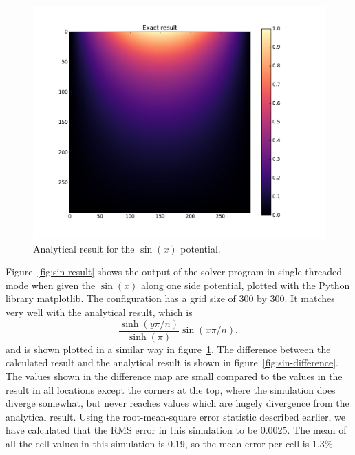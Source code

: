 	\begin{figure}[h]
	\centering
	\includegraphics[width=1.1\linewidth]{sin300_exact.pdf}
	\caption{Analytical result for the $\sin(x)$ potential.}
	\label{fig:sin-analytic}
	\end{figure}

Figure~\ref{fig:sin-result} shows the output of the solver program in single-threaded mode when given the $\sin(x)$ along one side
potential, plotted with the Python library matplotlib. The configuration has a grid size of 300 by 300. It matches very well with the analytical result, which
is
$$\frac{\sinh(y \pi / n)}{\sinh(\pi)} \sin(x \pi / n),$$
and is shown plotted in a similar way in figure~\ref{fig:sin-analytic}. The difference between the calculated result and the
analytical result is shown in figure~\ref{fig:sin-difference}. The values shown in the difference map are small compared
to the values in the result in all locations except the corners at the top, where the simulation does diverge somewhat, 
but never reaches values which are hugely divergence from the analytical result. Using the root-mean-square error statistic
described earlier, we have calculated that the RMS error in this simulation to be 0.0025. The mean of all the cell values in this
simulation is 0.19, so the mean error per cell is 1.3\%.


